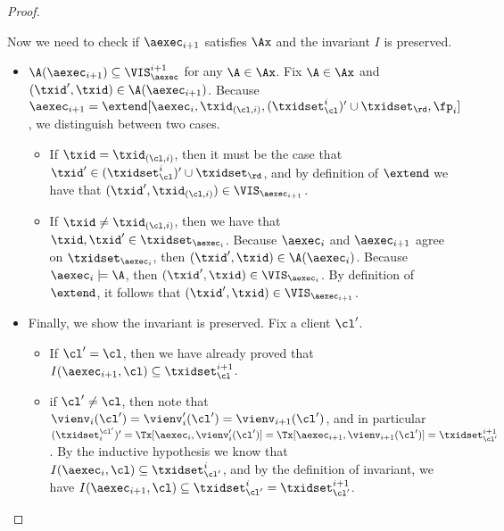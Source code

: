 \begin{proof}
\begin{itemize}
Now we need to check if \( \aexec_{i+1} \) satisfies \( \Ax\) and the invariant \( I \) is preserved.
\begin{itemize}
\item \(\A(\aexec_{i+1}) \subseteq \VIS_{\aexec}^{i+1}\) for any \(\A \in \Ax\).
Fix \(\A \in \Ax\) and \((\txid', \txid) \in \A(\aexec_{i+1})\). 
Because \(\aexec_{i+1} = \extend[\aexec_{i}, \txid_{(\cl, i)}, (\txidset_{\cl}^{i})' \cup \txidset_\rd, \fp_{i}]\), 
we distinguish between two cases.
\begin{itemize}
\item If \(\txid = \txid_{(\cl, i)}\), then it must be the case that \(\txid' \in (\txidset^{i}_{\cl})' \cup \txidset_\rd\), 
and by definition of \(\extend\) we have that \((\txid' ,\txid_{(\cl, i)}) \in \VIS_{\aexec_{i+1}}\). 
\item If \(\txid \neq \txid_{(\cl, i)}\), then we have that \(\txid, \txid' \in \txidset_{\aexec_{i}}\). 
Because \(\aexec_{i}\) and \(\aexec_{i+1}\) agree on \(\txidset_{\aexec_{i}}\), then \((\txid', \txid) \in \A(\aexec_{i})\).
Because \(\aexec_{i} \models \A\), then \((\txid', \txid) \in \VIS_{\aexec_{i}}\). 
By definition of \(\extend\), it follows that \((\txid', \txid) \in \VIS_{\aexec_{i+1}}\).
\end{itemize}

\item Finally, we show the invariant is preserved.
Fix a client \(\cl'\). 
\begin{itemize}
\item If \(\cl' = \cl\), then we have already proved that 
\(I(\aexec_{i+1}, \cl) \subseteq \txidset_{\cl}^{i+1}\). 
\item if \(\cl' \neq \cl\), then note that \(\vienv_{i}(\cl') = \vienv'_{i}(\cl') = \vienv_{i+1}(\cl')\), 
and in particular \((\txidset^{\cl'}_{i})' = \Tx[\aexec_{i}, \vienv'_{i}(\cl')] = \Tx[\aexec_{i+1}, \vienv_{i+1}(\cl')] =  \txidset_{\cl'}^{i+1}\).
By the inductive hypothesis we know that \(I(\aexec_{i}, \cl) \subseteq \txidset_{\cl'}^{i}\), 
and by the definition of invariant, we have \(I(\aexec_{i+1}, \cl) \subseteq \txidset_{\cl'}^{i} = \txidset_{\cl'}^{i+1}\). 
\end{itemize}
\end{itemize}
\end{itemize}
\end{proof}

